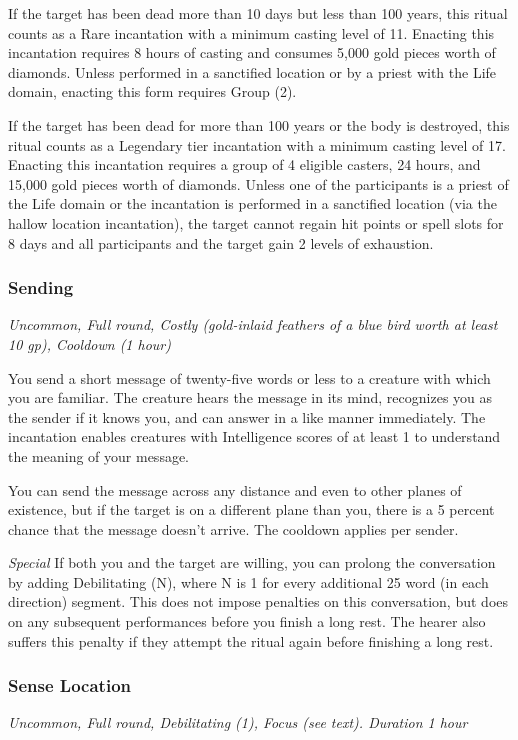 If the target has been dead more than 10 days but less than 100 years, this ritual counts as a Rare incantation with a minimum casting level of 11. Enacting this incantation requires 8 hours of casting and consumes 5,000 gold pieces worth of diamonds. Unless performed in a sanctified location or by a priest with the Life domain, enacting this form requires Group (2).

If the target has been dead for more than 100 years or the body is destroyed, this ritual counts as a Legendary tier incantation with a minimum casting level of 17. Enacting this incantation requires a group of 4 eligible casters, 24 hours, and 15,000 gold pieces worth of diamonds. Unless one of the participants is a priest of the Life domain or the incantation is performed in a sanctified location (via the hallow location incantation), the target cannot regain hit points or spell slots for 8 days and all participants and the target gain 2 levels of exhaustion.

\subsubsection{Sending}
\textit{Uncommon, Full round, Costly (gold-inlaid feathers of a blue bird worth at least 10 gp), Cooldown (1 hour)}

You send a short message of twenty-five words or less to a creature with which you are familiar. The creature hears the message in its mind, recognizes you as the sender if it knows you, and can answer in a like manner immediately. The incantation enables creatures with Intelligence scores of at least 1 to understand the meaning of your message.

You can send the message across any distance and even to other planes of existence, but if the target is on a different plane than you, there is a 5 percent chance that the message doesn't arrive. The cooldown applies per sender.

\textit{Special} If both you and the target are willing, you can prolong the conversation by adding Debilitating (N), where N is 1 for every additional 25 word (in each direction) segment. This does not impose penalties on this conversation, but does on any subsequent performances before you finish a long rest. The hearer also suffers this penalty if they attempt the ritual again before finishing a long rest.

\subsubsection{Sense Location}
\textit{Uncommon, Full round, Debilitating (1), Focus (see text). Duration 1 hour}

